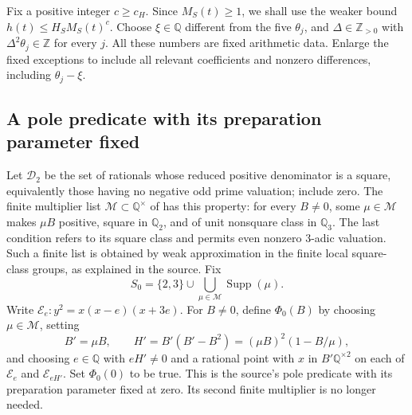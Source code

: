 \documentclass[11pt,reqno]{amsart}
\theoremstyle{definition}
\numberwithin{equation}{section}
\newcommand{\Q}{\mathbb Q}
\newcommand{\Z}{\mathbb Z}
\newcommand{\Supp}{\operatorname{Supp}}
\begin{document}
Fix a positive integer $c\ge c_H$. Since $M_S(t)\ge1$, we shall use the weaker bound $h(t)\le H_SM_S(t)^c$. Choose $\xi\in\Q$ different from the five $\theta_j$, and $\Delta\in\Z_{>0}$ with $\Delta^2\theta_j\in\Z$ for every $j$. All these numbers are fixed arithmetic data. Enlarge the fixed exceptions to include all relevant coefficients and nonzero differences, including $\theta_j-\xi$.

\subsection{A pole predicate with its preparation parameter fixed}
Let $\mathcal D_2$ be the set of rationals whose reduced positive denominator is a square, equivalently those having no negative odd prime valuation; include zero. The finite multiplier list $\mathcal M\subset\Q^\times$ of \cite[Section 3.2]{OAI} has this property: for every $B\ne0$, some $\mu\in\mathcal M$ makes $\mu B$ positive, square in $\Q_2$, and of unit nonsquare class in $\Q_3$. The last condition refers to its square class and permits even nonzero 3-adic valuation. Such a finite list is obtained by weak approximation in the finite local square-class groups, as explained in the source. Fix
\[
 S_0=\{2,3\}\cup\bigcup_{\mu\in\mathcal M}\Supp(\mu).
\]
Write $\mathcal E_e:y^2=x(x-e)(x+3e)$. For $B\ne0$, define $\Phi_0(B)$ by choosing $\mu\in\mathcal M$, setting
\begin{equation}\label{eq:phioriginal}
 B'=\mu B,\qquad H'=B'(B'-B^2)=(\mu B)^2(1-B/\mu),
\end{equation}
and choosing $e\in\Q$ with $eH'\ne0$ and a rational point with $x$ in $B'\Q^{\times2}$ on each of $\mathcal E_e$ and $\mathcal E_{eH'}$. Set $\Phi_0(0)$ to be true. This is the source's pole predicate with its preparation parameter fixed at zero. Its second finite multiplier is no longer needed.
\end{document}
